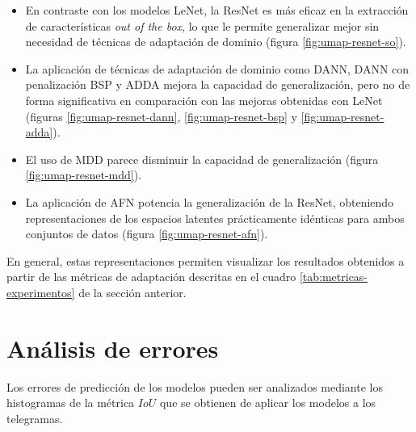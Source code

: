 \begin{itemize}
    \item En contraste con los modelos LeNet, la ResNet es más eficaz en la extracción de características {\it out of the box},
          lo que le permite generalizar mejor sin necesidad de técnicas de adaptación de dominio (figura
          \ref{fig:umap-resnet-so}).
    \item La aplicación de técnicas de adaptación de dominio como DANN, DANN con penalización BSP y ADDA mejora la capacidad de
          generalización, pero no de forma significativa en comparación con las mejoras obtenidas con LeNet (figuras
          \ref{fig:umap-resnet-dann}, \ref{fig:umap-resnet-bsp} y \ref{fig:umap-resnet-adda}).
    \item El uso de MDD parece disminuir la capacidad de generalización (figura \ref{fig:umap-resnet-mdd}).
    \item La aplicación de AFN potencia la generalización de la ResNet, obteniendo representaciones de los espacios latentes
          prácticamente idénticas para ambos conjuntos de datos (figura \ref{fig:umap-resnet-afn}).
\end{itemize}

En general, estas representaciones permiten visualizar los resultados obtenidos a partir de las métricas de adaptación
descritas en el cuadro \ref{tab:metricas-experimentos} de la sección anterior.

\section{Análisis de errores}

Los errores de predicción de los modelos pueden ser analizados mediante los histogramas de la métrica $IoU$ que se
obtienen de aplicar los modelos a los telegramas.

